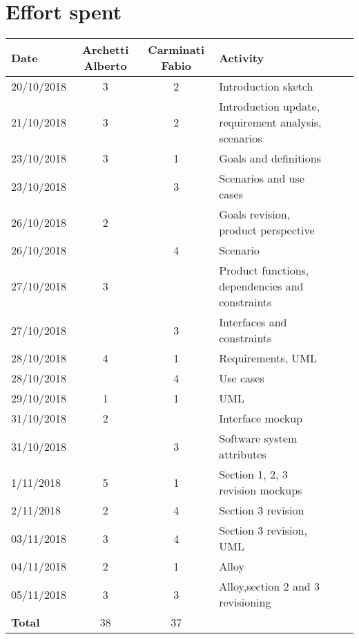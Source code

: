 
\section{Effort spent}

\label{sec:effort}

\begin{table}[h!]
\centering
\begin{tabularx}{\linewidth}{|l|c|c|X|Xl}
\hline
\textbf{Date}  & \textbf{Archetti Alberto} & \textbf{Carminati Fabio} & \textbf{Activity}                                \\
\hline
20/10/2018  & 3 & 2 & Introduction sketch                                             \\
\hline
21/10/2018 & 3 & 2 & Introduction update, requirement analysis, scenarios          \\
\hline
23/10/2018 & 3 & 1 & Goals and definitions                                             \\
 \hline
23/10/2018 & & 3 & Scenarios and use cases                                         \\
\hline
26/10/2018 & 2 & & Goals revision, product perspective          \\
\hline
26/10/2018 & & 4 & Scenario                                                         \\
 \hline
27/10/2018 & 3 & & Product functions, dependencies and constraints              \\
\hline
27/10/2018 & & 3 &Interfaces and constraints                                        \\
\hline
28/10/2018 & 4 & 1 & Requirements, UML                                               \\
 \hline
28/10/2018 & & 4 & Use cases                                                        \\
\hline
29/10/2018 &1 &1 &UML                                                             \\
\hline
31/10/2018 & 2 & & Interface mockup                                                \\
\hline
31/10/2018 & &3 & Software system attributes                                        \\
 \hline
1/11/2018 & 5 & 1& Section 1, 2, 3 revision mockups \\
 \hline
2/11/2018 & 2 & 4 &Section 3 revision                                                \\
\hline
03/11/2018 & 3 & 4 &Section 3 revision, UML                                       \\
\hline
04/11/2018 &2 & 1 &Alloy                                                             \\
\hline
05/11/2018 & 3 &3 &Alloy,section 2 and 3 revisioning       \\
\hline
\textbf{Total} & 38 &37 &       \\
\hline


\end{tabularx}

\end{table}
